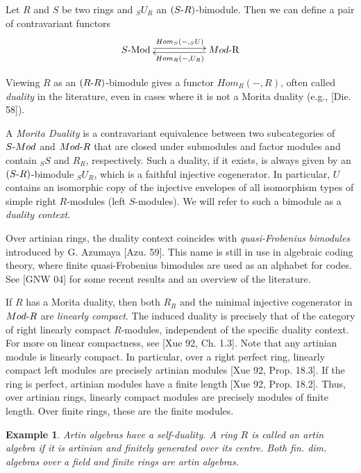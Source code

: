\documentclass[11pt]{article}
\theoremstyle{plain}
\newtheorem{Ex}[veta]{Example}
\theoremstyle{remark}
\theoremstyle{plain}
\begin{document}
\smallskip 


Let $R$ and $S$ be two rings and $_SU_R$ an $(S\text-R)$-bimodule. Then we can define a pair of contravariant functors \[
\xymatrix{
    S\text{-Mod} \ar@<0.5ex>[rr]^{Hom_S(-, _SU)} 
    & & Mod\text{-R} \ar@<0.5ex>[ll]^{Hom_R(-, U_R)}
}\]

Viewing $R$ as an $(R\text-R)$-bimodule gives a functor $Hom_R(-, R)$, often called  \textit{duality} in the literature, even in cases where it is not a Morita duality (e.g., [Die. 58]).

A \textit{Morita Duality} is a contravariant equivalence between two subcategories of  $S\text-Mod$ and $Mod\text-R$ that are closed under submodules and factor modules and contain $_SS$ and $R_R$, respectively. Such a duality, if it exists, is always given by an $(S\text-R)$-bimodule $_SU_R$, which is a faithful injective cogenerator. In particular, $U$ contains an isomorphic copy of the injective envelopes of all isomorphism types of simple right $R$-modules (left $S$-modules).  We will refer to such a bimodule as a \textit{duality context}. 

Over artinian rings, the duality context coincides with \textit{quasi-Frobenius bimodules} introduced by G. Azumaya [Azu. 59]. This name is still in use in algebraic coding theory, where finite quasi-Frobenius bimodules are used as an alphabet for codes. See [GNW 04] for some recent results and an overview of the literature.


If  $R$ has a Morita duality, then both $R_R$ and the minimal injective cogenerator in $Mod\text-R$ are \textit{linearly compact}. The induced duality is precisely that of the category of right linearly compact $R$-modules, independent of the specific duality context. For more on linear compactness, see [Xue 92, Ch. 1.3]. Note that any artinian module is linearly compact. In particular, over a right perfect ring, linearly compact left modules are precisely artinian modules [Xue 92, Prop. 18.3]. If the ring is perfect, artinian modules have a finite length [Xue 92, Prop. 18.2]. Thus, over artinian rings, linearly compact modules are precisely modules of finite length. Over finite rings, these are the finite modules.

\begin{Ex}
 Artin algebras have a self-duality. A ring $R$ is called an \textit{artin algebra} if it is artinian and finitely generated over its centre. Both fin. dim. algebras over a field and finite rings are artin algebras. 
\end{Ex}
\end{document}
